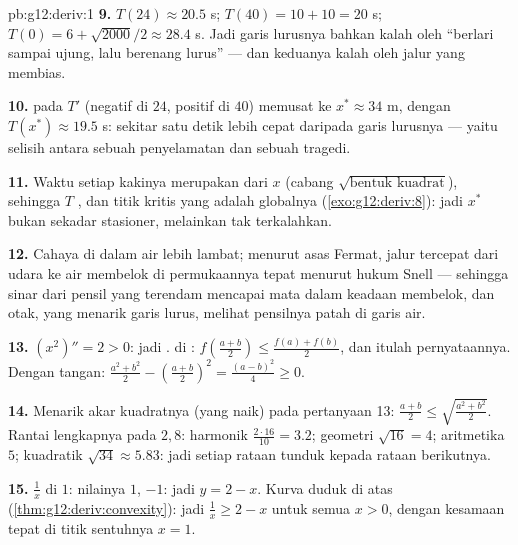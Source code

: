 \begin{solution}{pb:g12:deriv:1}
\textbf{9.} $T(24) \approx 20.5$ s; $T(40) = 10 + 10 = 20$ s;
$T(0) = 6 + \sqrt{2000}/2 \approx 28.4$ s. Jadi garis lurusnya
bahkan kalah oleh ``berlari sampai ujung, lalu berenang lurus'' --- dan
keduanya kalah oleh jalur yang membias.

\textbf{10.}  pada $T'$ (negatif di $24$, positif di
$40$) memusat ke $x^* \approx 34$ m, dengan
$T(x^*) \approx 19.5$ s: sekitar satu detik lebih cepat daripada
garis lurusnya --- yaitu selisih antara sebuah penyelamatan dan sebuah
tragedi.

\textbf{11.} Waktu setiap kakinya merupakan   dari $x$
(cabang $\sqrt{\text{bentuk kuadrat}}$), sehingga $T$ , dan
titik kritis   yang  adalah 
globalnya (\cref{exo:g12:deriv:8}): jadi $x^*$ bukan sekadar
stasioner, melainkan tak terkalahkan.

\textbf{12.} Cahaya di dalam air lebih lambat; menurut asas Fermat,
jalur tercepat dari udara ke air membelok di permukaannya tepat menurut
hukum Snell --- sehingga sinar dari pensil yang terendam mencapai mata
dalam keadaan membelok, dan otak, yang menarik garis lurus, melihat
pensilnya patah di garis air.

\textbf{13.} $(x^2)'' = 2 > 0$: jadi .  di
: $f\left(\frac{a+b}{2}\right) \leq
\frac{f(a) + f(b)}{2}$, dan itulah pernyataannya. Dengan tangan:
$\frac{a^2 + b^2}{2} - \left(\frac{a+b}{2}\right)^2 =
\frac{(a - b)^2}{4} \geq 0$.

\textbf{14.} Menarik akar kuadratnya (yang naik) pada pertanyaan 13:
$\frac{a + b}{2} \leq \sqrt{\frac{a^2 + b^2}{2}}$. Rantai lengkapnya
pada $2, 8$: harmonik $\frac{2 \cdot 16}{10} = 3.2$; geometri
$\sqrt{16} = 4$; aritmetika $5$; kuadratik
$\sqrt{34} \approx 5.83$: jadi setiap rataan tunduk kepada rataan berikutnya.

\textbf{15.}  $\frac1x$ di $1$: nilainya $1$, 
$-1$: jadi $y = 2 - x$. Kurva  duduk di atas 
(\cref{thm:g12:deriv:convexity}): jadi $\frac1x \geq 2 - x$ untuk semua
$x > 0$, dengan kesamaan tepat di titik sentuhnya $x = 1$.


\end{solution}
